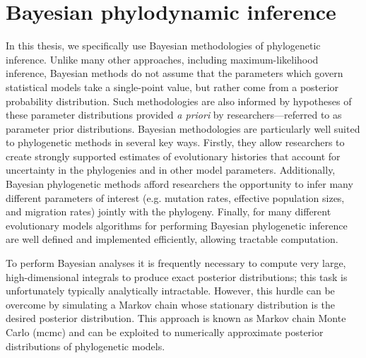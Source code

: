 \section{Bayesian phylodynamic inference}

In this thesis, we specifically use Bayesian methodologies of phylogenetic inference.
Unlike many other approaches, including maximum-likelihood inference, Bayesian methods do not assume that the parameters which govern statistical models take a single-point value, but rather come from a posterior probability distribution.
Such methodologies are also informed by hypotheses of these parameter distributions provided \textit{a priori} by researchers---referred to as parameter prior distributions.
Bayesian methodologies are particularly well suited to phylogenetic methods in several key ways.
Firstly, they allow researchers to create strongly supported estimates of evolutionary histories that account for uncertainty in the phylogenies and in other model parameters.
Additionally, Bayesian phylogenetic methods afford researchers the opportunity to infer many different parameters of interest (e.g. mutation rates, effective population sizes, and migration rates) jointly with the phylogeny.
Finally, for many different evolutionary models algorithms for performing Bayesian phylogenetic inference are well defined and implemented efficiently, allowing tractable computation.

To perform Bayesian analyses it is frequently necessary to compute very large, high-dimensional integrals to produce exact posterior distributions; this task is unfortunately typically analytically intractable.
However, this hurdle can be overcome by simulating a Markov chain whose stationary distribution is the desired posterior distribution.
This approach is known as Markov chain Monte Carlo (\gls{mcmc}) and can be exploited to numerically approximate posterior distributions of phylogenetic models.

